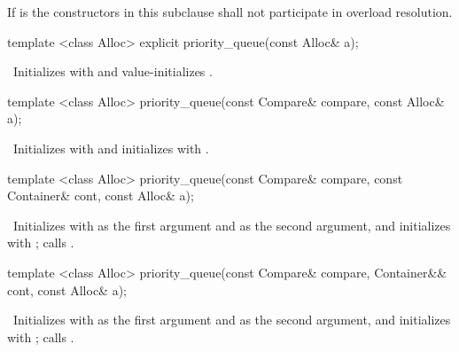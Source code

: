 \pnum
If  is 
the constructors in this subclause shall not participate in overload resolution.

%
\begin{itemdecl}
template <class Alloc> explicit priority_queue(const Alloc& a);
\end{itemdecl}

\begin{itemdescr}
\pnum
\effects\ Initializes  with  and value-initializes .
\end{itemdescr}

%
\begin{itemdecl}
template <class Alloc> priority_queue(const Compare& compare, const Alloc& a);
\end{itemdecl}

\begin{itemdescr}
\pnum
\effects\ Initializes  with  and initializes  with .
\end{itemdescr}

%
\begin{itemdecl}
template <class Alloc>
  priority_queue(const Compare& compare, const Container& cont, const Alloc& a);
\end{itemdecl}

\begin{itemdescr}
\pnum
\effects\ Initializes  with  as the first argument and  as the second
argument, and initializes  with ;
calls .
\end{itemdescr}

%
\begin{itemdecl}
template <class Alloc>
  priority_queue(const Compare& compare, Container&& cont, const Alloc& a);
\end{itemdecl}

\begin{itemdescr}
\pnum
\effects\ Initializes  with  as the first argument and 
as the second argument, and initializes  with ;
calls .
\end{itemdescr}

